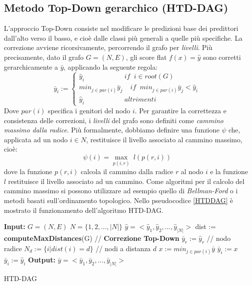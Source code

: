 \documentclass[12pt]{report}
\begin{document}
\subsection{Metodo Top-Down gerarchico (HTD-DAG)}
L'approccio Top-Down\cite{notaro1} consiste nel modificare le predizioni base dei predittori dall'alto verso il basso, e cioè dalle classi più generali a quelle più specifiche.
\newline
\newline
La correzione avviene ricorsivamente, percorrendo il grafo per \emph{livelli}. Più precisamente, dato il grafo $G = (N, E)$, gli score flat $f(x) = \hat{y}$ sono corretti gerarchicamente a $\bar{y}$, applicando la seguente regola:
\[
\bar{y}_i := 
\begin{cases}
\hat{y}_i \;\;\;\;\;\;\;\;\;\;\;\;\;\;\;\;\;\;\;\;\; if\;\; i \in root(G)\\
min_{j \in par(i)} \bar{y}_j \;\;\;\; if \;\; min_{j \in par(i)}\bar{y}_j < \hat{y}_i\\
\hat{y}_i \;\;\;\;\;\;\;\;\;\;\;\;\;\;\;\;\;\;\;\;\; altrimenti
\end{cases}
\]
Dove $par(i)$ specifica i genitori del nodo $i$.
\newline
\newline
Per garantire la correttezza e consistenza delle correzioni, i \emph{livelli} del grafo sono definiti come \emph{cammino massimo dalla radice}. Più formalmente, dobbiamo definire una funzione $\psi$ che, applicata ad un nodo $i \in N$, restituisce il livello associato al cammino massimo, cioè:
\[
\psi(i) = \max_{p(i, r)}\; l(p(r, i))
\]
dove la funzione $p(r, i)$ calcola il cammino dalla radice $r$ al nodo $i$ e la funzione $l$ restituisce il livello associato ad un cammino.
\newline
Come algoritmi per il calcolo del cammino massimo si possono utilizzare ad esempio quello di \emph{Bellman-Ford} o i metodi basati sull'ordinamento topologico\cite{BELLMAN}.
\newline
\newline
Nello pseudocodice \ref{HTDDAG} è mostrato il funzionamento dell'algoritmo HTD-DAG.
\begin{algorithm}[!htp]
\begin{algorithmic}[1]
\State \textbf{Input: }
\State $G = (N, E)$
\State $N = \{1, 2, ..., |N|\} $ 
\State $\hat{y} = <\hat{y}_1, \hat{y}_2, ...,\hat{y}_{|N|}>$
\State dist := \textbf{computeMaxDistances}(G)
\State // \textbf{Correzione Top-Down}
\State $\bar{y}_r := \hat{y}_r$  // nodo radice 
\State $N_d := \{i|dist(i) = d\}$ // nodi a distanza $d$ 
\State $x:= min_{j \in par(i)} \bar{y}$
\State $\bar{y}_i := x $
\Else
\State $\bar{y}_i := \hat{y}_i $
\EndIf
\EndFor
\EndFor
\EndProcedure
\State \textbf{Output: }
\State $\bar{y} = <\bar{y}_1, \bar{y}_2, ...,\bar{y}_{|N|}>$
\end{algorithmic}
\caption{HTD-DAG}
\label{HTDDAG}
\end{algorithm}
\end{document}
